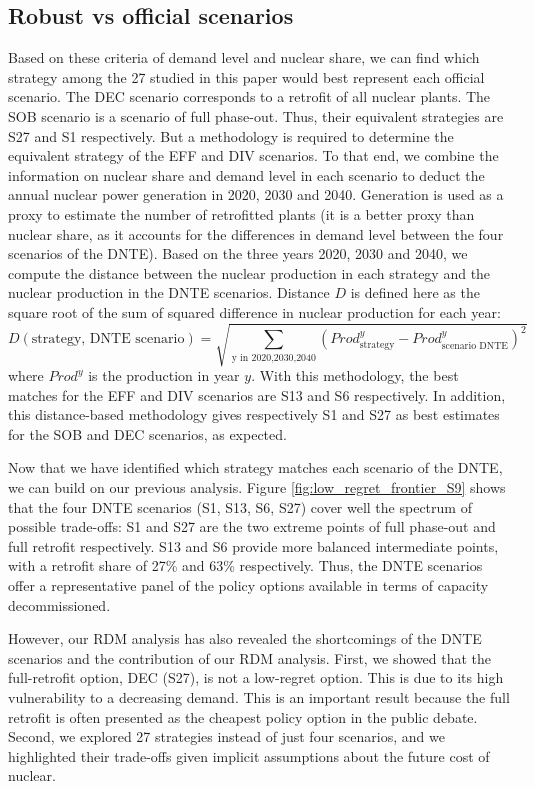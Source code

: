 \subsection{Robust vs official scenarios}
Based on these criteria of demand level and nuclear share, we can find which strategy among the 27 studied in this paper would best represent each official scenario. 
The DEC scenario corresponds to a retrofit of all nuclear plants. The SOB scenario is a scenario of full phase-out. Thus, their equivalent strategies are S27 and S1 respectively. But a methodology is required to determine the equivalent strategy of the EFF and DIV scenarios. 
To that end, we combine the information on nuclear share and demand level in each scenario to deduct the annual nuclear power generation in 2020, 2030 and 2040.
Generation is used as a proxy to estimate the number of retrofitted plants (it is a better proxy than nuclear share, as it accounts for the differences in demand level between the four scenarios of the DNTE). Based on the three years 2020, 2030 and 2040, we compute the distance between the nuclear production in each strategy and the nuclear production in the DNTE scenarios. Distance $D$ is defined here as the square root of the sum of squared difference in nuclear production for each year:
$$D(\text{strategy, DNTE scenario}) = \sqrt{ \sum_{\text{y in {2020,2030,2040}}} (Prod^y_{\text{strategy}} - Prod^y_{\text{scenario DNTE}})^2}$$
where $Prod^y$ is the production in year $y$.
With this methodology, the best matches for the EFF and DIV scenarios are S13 and S6 respectively. In addition, this distance-based methodology gives respectively S1 and S27 as best estimates for the SOB and DEC scenarios, as expected.

Now that we have identified which strategy matches each scenario of the DNTE, we can build on our previous analysis. Figure \ref{fig:low_regret_frontier_S9} shows that the four DNTE scenarios (S1, S13, S6, S27) cover well the spectrum of possible trade-offs: S1 and S27 are the two extreme points of full phase-out and full retrofit respectively. S13 and S6 provide more balanced intermediate points, with a retrofit share of 27\% and 63\% respectively. Thus, the DNTE scenarios offer a representative panel of the policy options available in terms of capacity decommissioned.

However, our RDM analysis has also revealed the shortcomings of the DNTE scenarios and the contribution of our RDM analysis. 
First, we showed that the full-retrofit option, DEC (S27), is not a low-regret option. This is due to its high vulnerability to a decreasing demand. This is an important result because the full retrofit is often presented as the cheapest policy option in the public debate.
Second, we explored 27 strategies instead of just four scenarios, and we highlighted their trade-offs given implicit assumptions about the future cost of nuclear. 


